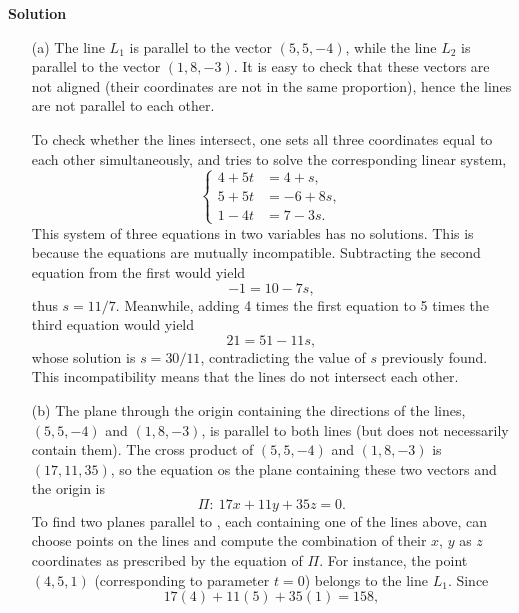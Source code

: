 \documentclass[12pt,oneside]{exam}
\newenvironment{newsolution}{\vspace{.1in}\noindent\textbf{Solution \hspace{.05em}}}{}
\begin{document}
\begin{newsolution}
\begin{itemize}
\item[(a)] The line $L_1$ is parallel to the vector $(5,5,-4)$, while the line $L_2$ is parallel to the vector $(1,8,-3)$. It is easy to check that these vectors are not aligned (their coordinates are not in the same proportion), hence the lines are not parallel to each other. 

To check whether the lines intersect, one sets all three coordinates equal to each other simultaneously, and tries to solve the corresponding linear system, 
\begin{equation*}
\left\{ 
\begin{array}{cc}
4+5t & = 4+s, \\
5 + 5t & = -6 +8s,\\ 
1-4t & = 7-3s.
\end{array}
\right.
\end{equation*}
This system of three equations in two variables has no solutions. This is because the equations are mutually incompatible. Subtracting the second equation from the first would yield
\begin{equation*}
-1 = 10 -7s, 
\end{equation*}
thus $s=11/7$. 
Meanwhile, adding 4 times the first equation to 5 times the third equation would yield
\begin{equation*}
21 = 51 - 11s,
\end{equation*} 
whose solution is $s=30/11$, contradicting the value of $s$ previously found. This incompatibility means that the lines do not intersect each other. 
\item[(b)] The plane through the origin containing the directions of the lines, $(5,5,-4)$ and $(1,8,-3)$, is parallel to both lines (but does not necessarily contain them). The cross product of $(5,5,-4)$ and $(1,8,-3)$ is $(17,11,35)$, so the equation os the plane containing these two vectors and the origin is 
\begin{equation*}
\Pi \colon \ 17x + 11 y + 35 z =0.
\end{equation*}
To find two planes parallel to , each containing one of the lines above, can choose points on the lines and compute the combination of their $x$, $y$ as $z$ coordinates as prescribed by the equation of $\Pi$. For instance, the point $(4,5,1)$ (corresponding to parameter $t=0$) belongs to the line $L_1$. Since 
\begin{equation*}
17(4) + 11(5) + 35(1) = 158, 

\end{equation*}
\end{itemize}
\end{newsolution}
\end{document}
